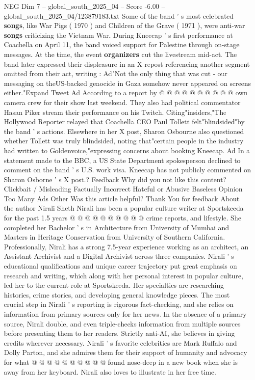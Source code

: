 \begin{textsample}{NEG Dim 7 – global\_south\_2025\_04 – Score -6.00 – global\_south\_2025\_04/123879183.txt}
Some of the band ' s most celebrated \textbf{songs}, like War Pigs ( 1970 ) and Children of the Grave ( 1971 ), were anti-war \textbf{songs} criticizing the Vietnam War.
During Kneecap ' s first performance at Coachella on April 11, the band voiced support for Palestine through on-stage messages.
At the time, the event \textbf{organizers} cut the livestream mid-act.
The band later expressed their displeasure in an X repost referencing another segment omitted from their act, writing : Ad"Not the only thing that was cut - our messaging on theUS-backed genocide in Gaza somehow never appeared on screens either."Expand Tweet Ad According to a report by @ @ @ @ @ @ @ @ @ @ own camera crew for their show last weekend.
They also had political commentator Hasan Piker stream their performance on his Twitch.
Citing"insiders,"The Hollywood Reporter relayed that Coachella CEO Paul Tollett felt"blindsided"by the band ' s actions.
Elsewhere in her X post, Sharon Osbourne also questioned whether Tollett was truly blindsided, noting that"certain people in the industry had written to Goldenvoice,"expressing concerns about booking Kneecap.
Ad In a statement made to the BBC, a US State Department spokesperson declined to comment on the band ' s U.S. work visa.
Kneecap has not publicly commented on Sharon Osborne ' s X post.?
Feedback Why did you not like this content?
Clickbait / Misleading Factually Incorrect Hateful or Abusive Baseless Opinion Too Many Ads Other Was this article helpful?
Thank You for feedback About the author Nirali Sheth Nirali has been a popular culture writer at Sportskeeda for the past 1.5 years @ @ @ @ @ @ @ @ @ @ crime reports, and lifestyle.
She completed her Bachelor ' s in Architecture from University of Mumbai and Masters in Heritage Conservation from University of Southern California.
Professionally, Nirali has a strong 7.5-year experience working as an architect, an Assistant Archivist and a Digital Archivist across three companies.
Nirali ' s educational qualifications and unique career trajectory put great emphasis on research and writing, which along with her personal interest in popular culture, led her to the current role at Sportskeeda.
Her specialties are researching histories, crime stories, and developing general knowledge pieces.
The most crucial step in Nirali ' s reporting is rigorous fact-checking, and she relies on information from primary sources only for her news.
In the absence of a primary source, Nirali double, and even triple-checks information from multiple sources before presenting them to her readers.
Strictly anti-AI, she believes in giving credits wherever necessary.
Nirali ' s favorite celebrities are Mark Ruffalo and Dolly Parton, and she admires them for their support of humanity and advocacy for what @ @ @ @ @ @ @ @ @ @ found nose-deep in a new book when she is away from her keyboard.
Nirali also loves to illustrate in her free time.

\end{textsample}
